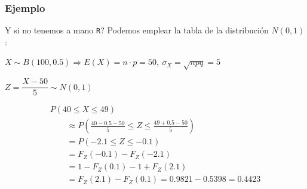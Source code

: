 \documentclass[handout]{beamer}\usepackage[]{graphicx}\usepackage[]{color}
\renewcommand{\leq}{\leqslant}
\theoremstyle{plain}
\theoremstyle{definition}
\begin{document}
\begin{frame}
\frametitle{Ejemplo}
\vspace*{-1ex}

Y si no tenemos a mano  {\tt R}? Podemos emplear la tabla de la distribución $N(0,1)$:\medskip

$X\sim B(100,0.5)\Rightarrow E(X)=n\cdot p=50,\ \sigma_{X}=\sqrt{npq}=5$
\medskip

$Z=\dfrac{X-50}{5}\sim N(0,1)$

$$
\begin{array}{l}
P(40\leq X\leq 49) \\ \displaystyle \qquad \approx  P\left(\frac{40-0.5-50}{5}\leq Z\leq
    \frac{49+0.5-50}{5}\right) \\[2ex] \displaystyle 
\qquad =  P(-2.1\leq Z\leq -0.1)\\[1ex]\displaystyle 
\qquad =
    F_{Z}(-0.1)-  F_{Z}(-2.1) \\[1ex] \displaystyle 
\qquad =    1-F_{Z}(0.1)-1+F_{Z}(2.1)\\[1ex] \displaystyle 
\qquad =
F_{Z}(2.1)-F_{Z}(0.1) = 0.9821-0.5398=0.4423
\end{array}
$$
\end{frame}





%
%
%
%
%
%
\end{document}
